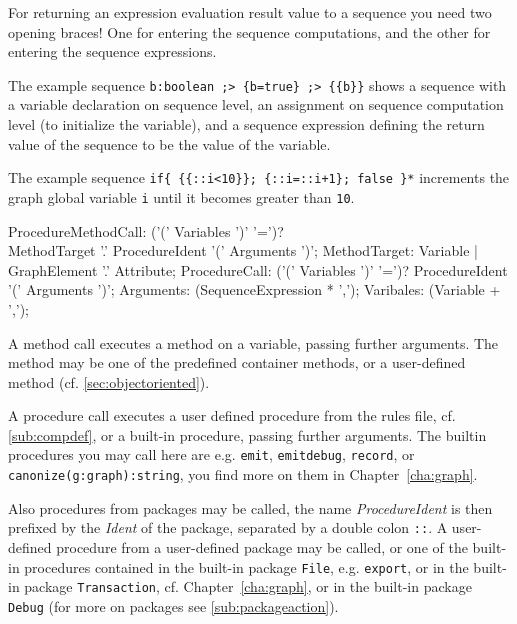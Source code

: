 \begin{note}
For returning an expression evaluation result value to a sequence you need two opening braces! 
One for entering the sequence computations, and the other for entering the sequence expressions.
\end{note}

\begin{example}
The example sequence
\verb#b:boolean ;> {b=true} ;> {{b}}#
shows a sequence with a variable declaration on sequence level, an assignment on sequence computation level (to initialize the variable), and a sequence expression defining the return value of the sequence to be the value of the variable.

The example sequence
\verb#if{ {{::i<10}}; {::i=::i+1}; false }*#
increments the graph global variable \texttt{i} until it becomes greater than \texttt{10}.
\end{example}

\begin{rail} 
	ProcedureMethodCall: ('(' Variables ')' '=')? \\ MethodTarget '.' ProcedureIdent '(' Arguments ')';
	MethodTarget: Variable | GraphElement '.' Attribute;
	ProcedureCall: ('(' Variables ')' '=')? ProcedureIdent '(' Arguments ')';
	Arguments: (SequenceExpression * ',');
	Varibales: (Variable + ',');
\end{rail}

A method call executes a method on a variable, passing further arguments.
The method may be one of the predefined container methods, or a user-defined method (cf. \ref{sec:objectoriented}).

A procedure call executes a user defined procedure from the rules file, cf. \ref{sub:compdef},
or a built-in procedure, passing further arguments.
The builtin procedures you may call here are e.g. \texttt{emit}, \texttt{emitdebug}, \texttt{record}, or \texttt{canonize(g:graph):string}, you find more on them in Chapter~\ref{cha:graph}.

Also procedures from packages may be called, the name \emph{ProcedureIdent} is then prefixed by the \emph{Ident} of the package, separated by a double colon \texttt{::}.
A user-defined procedure from a user-defined package may be called, or one of the built-in procedures contained in the built-in package \texttt{File}, e.g. \texttt{export}, or in the  built-in package \texttt{Transaction}, cf. Chapter~\ref{cha:graph}, or in the built-in package \texttt{Debug} (for more on packages see \ref{sub:packageaction}).

